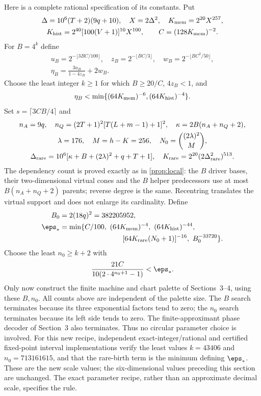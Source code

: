 Here is a complete rational specification of its constants. Put
\[
 \begin{gathered}
 \Delta=10^6(T+2)(9q+10),\quad X=2\Delta^2,\quad
 K_{\rm mem}=2^{20}X^{257},\\
 K_{\rm hist}=2^{40}[100(V+1)]^{10}X^{100},\qquad
 C=(128K_{\rm mem})^{-2}.
 \end{gathered}
\]
For $B=4^k$ define
\[
 \begin{gathered}
 u_B=2^{-\lfloor3BC/100\rfloor},\quad
 z_B=2^{-\lfloor BC/3\rfloor},\quad
 w_B=2^{-\lfloor BC^2/50\rfloor},\\
 \eta_B=\frac{3u_B}{1-4z_B}+2w_B.
 \end{gathered}
\]
Choose the least integer $k\ge1$ for which $B\ge20/C$, $4z_B<1$, and
\[
 \eta_B<\min\{(64K_{\rm mem})^{-6},(64K_{\rm hist})^{-4}\}.
\]
Set $s=\lceil3CB/4\rceil$ and
\[
 \begin{gathered}
 n_A=9q,\quad n_Q=(2T+1)^2[T(L+m-1)+1]^2,\quad
 \kappa=2B(n_A+n_Q+2),\\
 \lambda=176,\quad M=h-K=256,\quad
 N_0=\binom{(2\lambda)^2}{M},\\
 \Delta_{\rm rare}=10^6[\kappa+B+(2\lambda)^2+q+T+1],\quad
 K_{\rm rare}=2^{20}(2\Delta_{\rm rare}^2)^{513}.
 \end{gathered}
\]
The dependency count is proved exactly as in \cref{prop:local}: the $B$ driver bases, their two-dimensional virtual cones and the $B$ helper predecessors use at most $B(n_A+n_Q+2)$ parents; reverse degree is the same. Recentring translates the virtual support and does not enlarge its cardinality. Define
\[
 \begin{split}
 B_0&=2(18q)^2=382205952,\\
 \eps_*&=\min\{C/100,\ (64K_{\rm mem})^{-4},\ (64K_{\rm hist})^{-44},\\
 &\hspace{31mm}[64K_{\rm rare}(N_0+1)]^{-16},\ B_0^{-33720}\}.
 \end{split}
\]
Choose the least $n_0\ge k+2$ with
\[
 \frac{21C}{10(2\cdot4^{n_0+1}-1)}<\eps_*.
\]
Only now construct the finite machine and chart palette of Sections~3--4, using these $B,n_0$. All counts above are independent of the palette size. The $B$ search terminates because its three exponential factors tend to zero; the $n_0$ search terminates because its left side tends to zero. The finite-approximant phase decoder of Section~3 also terminates. Thus no circular parameter choice is involved. For this new recipe, independent exact-integer/rational and certified fixed-point interval implementations verify the least values $k=43406$ and $n_0=713161615$, and that the rare-birth term is the minimum defining $\eps_*$. These are the new scale values; the six-dimensional values preceding this section are unchanged. The exact parameter recipe, rather than an approximate decimal scale, specifies the rule.

